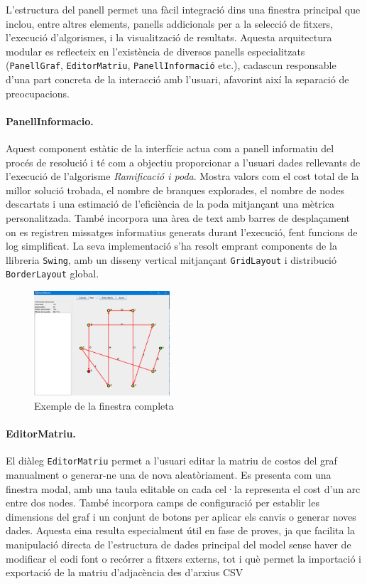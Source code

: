 \documentclass{ieeetj}
\begin{document}
L’estructura del panell permet una fàcil integració dins una finestra principal que inclou, entre altres elements, panells addicionals per a la selecció de fitxers, l’execució d’algorismes, i la visualització de resultats. Aquesta arquitectura modular es reflecteix en l’existència de diversos panells especialitzats (\texttt{PanellGraf}, \texttt{EditorMatriu},  \texttt{PanellInformació}  etc.), cadascun responsable d’una part concreta de la interacció amb l’usuari, afavorint així la separació de preocupacions.

\paragraph{PanellInformacio.}
Aquest component estàtic de la interfície actua com a panell informatiu del procés de resolució i té com a objectiu proporcionar a l’usuari dades rellevants de l’execució de l’algorisme \textit{Ramificació i poda}. Mostra valors com el cost total de la millor solució trobada, el nombre de branques explorades, el nombre de nodes descartats i una estimació de l'eficiència de la poda mitjançant una mètrica personalitzada. També incorpora una àrea de text amb barres de desplaçament on es registren missatges informatius generats durant l’execució, fent funcions de log simplificat. 
La seva implementació s’ha resolt emprant components de la llibreria \texttt{Swing}, amb un disseny vertical mitjançant \texttt{GridLayout} i distribució \texttt{BorderLayout} global.

\begin{figure}[H]
    \centering
    \includegraphics[width=0.45\textwidth]{png/finestra.png}
    \caption{Exemple de la finestra completa }
    \label{fig:enter-label}
\end{figure}

\paragraph{EditorMatriu.}
El diàleg \texttt{EditorMatriu} permet a l’usuari editar la matriu de costos del graf manualment o generar-ne una de nova aleatòriament. Es presenta com una finestra modal, amb una taula editable on cada cel·la representa el cost d’un arc entre dos nodes. També incorpora camps de configuració per establir les dimensions del graf i un conjunt de botons per aplicar els canvis o generar noves dades. 
Aquesta eina resulta especialment útil en fase de proves, ja que facilita la manipulació directa de l’estructura de dades principal del model sense haver de modificar el codi font o recórrer a fitxers externs, tot i què permet la importació i exportació de la matriu d'adjacència des d'arxius CSV\newline
\end{document}
